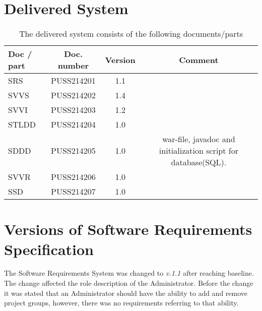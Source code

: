 \documentclass{article}
\begin{document}
\section{Delivered System}
 \begin{table}[h]
            \centering
            
             
            \begin{tabular}{|l|c|c|c|}
                \hline
                    \textbf{Doc / part} & \textbf{Doc.  number} & \textbf{Version} & \textbf{Comment} \\
                \hline
                    SRS & PUSS214201 & 1.1 &   \\
                 \hline
                    SVVS & PUSS214202 & 1.4 &  \\
                 \hline
                    SVVI & PUSS214203 & 1.2 &  \\
                 \hline
                    STLDD & PUSS214204 & 1.0 &  \\
                 \hline
                    SDDD & PUSS214205  & 1.0 & war-file, javadoc and initialization script for database(SQL).   \\

                 \hline
                    SVVR & PUSS214206 & 1.0 &  \\
                    
                 \hline
                    SSD & PUSS214207 & 1.0 &  \\
                 \hline
                 
            \end{tabular}
            \caption{The delivered system consists of the following documents/parts}
           
            \label{activitytable}
        \end{table}
        
        \section{Versions of Software Requirements Specification}
        The Software Requirements System was changed to \textit{v.1.1} after reaching baseline. The change affected the role description of the Administrator. Before the change it was stated that an Administrator should have the ability to add and remove project groups, however, there was no requirements referring to that ability.
        
     
\end{document}
